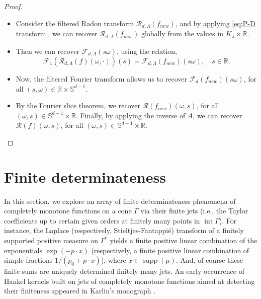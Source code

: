 \documentclass[11pt,reqno]{amsart}
\theoremstyle{plain}
\theoremstyle{definition}
\numberwithin{equation}{section}
\newcommand{\R}{\mathbb{R}}
\newcommand{\ltt}{\left(}
\newcommand{\rtt}{\right)}
\begin{document}
\begin{proof}
\begin{itemize}
        \item[(iv)]Consider the filtered Radon transform $\mathcal R_{d,\Lambda}(f_{new})$, and by applying \eqref{eq:P-D transform}, we can recover $\mathcal R_{d,\Lambda}(f_{new})$ globally from the values in $K_{\lambda}\times \R$.
        \item[(v)] Then we can  recover $\mathcal F_{d,\Lambda}(s\omega)$, using the relation,
        \[
        \mathcal F_1\ltt\mathcal R_{d,\Lambda}(f)(\omega,\cdot)\rtt(s)= \mathcal F_{d,\Lambda}(f_{new})(s\omega),\quad s\in\R.
        \]
        \item[(vi)] Now, the filtered Fourier transform allows us to recover $\mathcal F_d(f_{new})(s\omega)$, for all $(s,\omega)\in \R\times \mathbb S^{d-1}$.   
        \item[(vii)] By the Fourier slice theorem, we recover $\mathcal R(f_{new})(\omega,s)$, for all $(\omega,s)\in\mathbb S^{d-1}\times \R$. Finally, by applying the inverse of $A$, we can recover $\mathcal R(f)(\omega,s)$, for all $(\omega,s)\in\mathbb S^{d-1}\times \R$.
    \end{itemize}

\end{proof}


\section{Finite determinateness} \label{Section:Finite-Deter}
In this section, we explore an array of finite determinateness phenomena of completely monotone functions on a cone $\Gamma$ via their finite jets (i.e., the Taylor coefficients up to certain given orders at finitely many points in $\operatorname{int} \Gamma$).
For instance, the Laplace (respectively, Stieltjes-Fantappi\'e) transform of a finitely supported positive measure on $\Gamma^*$ yields a finite positive linear combination of the exponentials $\exp(-p \cdot x)$ (respectively, a finite positive linear combination of simple fractions $1/(p_0 + p \cdot x)$), where $x \in \operatorname{supp}(\mu)$. And, of course these finite sums are uniquely determined finitely many jets. An early occurrence of Hankel kernels built on jets of completely monotone functions aimed at detecting their finiteness appeared in Karlin's monograph \cite[Section 7 of Chapter 2]{Karlin}.
\end{document}
